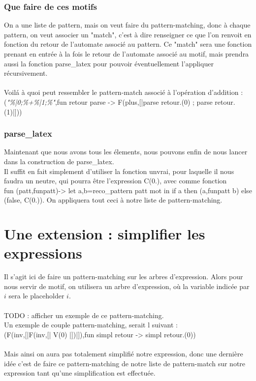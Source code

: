 \documentclass{article}
\theoremstyle{definition}
\newcommand{\chcar}[1]{{\fontfamily{lmtt}\selectfont \color{codepurple}\textit{#1}}}
\newcommand{\codecml}[1]{\colorbox{backcolour}{\fontfamily{phv}\selectfont #1}}
\begin{document}
\subsubsection{Que faire de ces motifs}
On a une liste de pattern, mais on veut faire du pattern-matching, donc \`a chaque pattern, on veut associer un "match", c'est \`a dire renseigner ce que l'on renvoit en fonction du retour de l'automate associ\'e au pattern. Ce "match" sera une fonction prenant en entr\'ee \`a la fois le retour de l'automate associ\'e au motif, mais prendra aussi la fonction \codecml{parse\_latex} pour pouvoir \'eventuellement l'appliquer r\'ecursivement.\\\\
Voil\'a \`a quoi peut ressembler le pattern-match associ\'e \`a l'op\'eration d'addition :\\
\codecml{(\chcar{"\%|0;\%+\%|1;\%"},fun retour parse -> F(plus,[|parse retour.(0) ; parse retour.(1)|]))}

\subsubsection{\codecml{parse\_latex}}
Maintenant que nous avons tous les \'elements, nous pouvons enfin de nous lancer dans la construction de \codecml{parse\_latex}.\\
Il suffit en fait simplement d'utiliser la fonction \codecml{unvrai}, pour laquelle il nous faudra un neutre, qui pourra \^etre l'expression \codecml{C(0.)}, avec comme fonction \\
\codecml{fun (patt,funpatt)-> let a,b=reco\_pattern patt mot in if a then (a,funpatt b) else (false, C(0.))}.
On appliquera tout ceci \`a notre liste de pattern-matching.
\section{Une extension : simplifier les expressions}
Il s'agit ici de faire un pattern-matching sur les arbres d'expression. Alors pour nous servir de motif, on utilisera un arbre d'expression, o\`u la variable indic\'ee par $i$ sera le placeholder $i$.\\\\
{\Large TODO : afficher un exemple de ce pattern-matching.}\\
Un exemple de couple pattern-matching, serait l suivant : \\
\codecml{(F(inv,[|F(inv,[| V(0) |])|]),fun simpl retour -> simpl retour.(0))}\\\\
Mais ainsi on aura pas totalement simplifi\'e notre expression, donc une derni\`ere id\'ee c'est de faire ce pattern-matching de notre liste de pattern-match sur notre expression tant qu'une simplification est effectu\'ee.
\listoffigures
\end{document}
